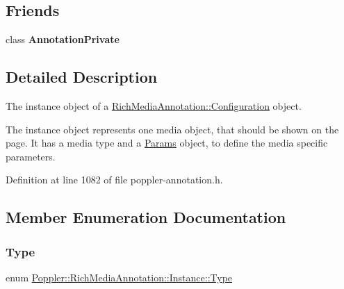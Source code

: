 \subsection*{Friends}
\begin{DoxyCompactItemize}
\item 
\mbox{\label{class_poppler_1_1_rich_media_annotation_1_1_instance_add0bc3e32e560f9e9eb3025587c1ad54}} 
class {\bfseries Annotation\+Private}
\end{DoxyCompactItemize}


\subsection{Detailed Description}
The instance object of a \hyperlink{class_poppler_1_1_rich_media_annotation_1_1_configuration}{Rich\+Media\+Annotation\+::\+Configuration} object.

The instance object represents one media object, that should be shown on the page. It has a media type and a \hyperlink{class_poppler_1_1_rich_media_annotation_1_1_params}{Params} object, to define the media specific parameters. 

Definition at line 1082 of file poppler-\/annotation.\+h.



\subsection{Member Enumeration Documentation}
\mbox{\label{class_poppler_1_1_rich_media_annotation_1_1_instance_ae1f530939f7bd947ac119b7315f5ec44}} 
\subsubsection{\texorpdfstring{Type}{Type}}
{\footnotesize\ttfamily enum \hyperlink{class_poppler_1_1_rich_media_annotation_1_1_instance_ae1f530939f7bd947ac119b7315f5ec44}{Poppler\+::\+Rich\+Media\+Annotation\+::\+Instance\+::\+Type}}

